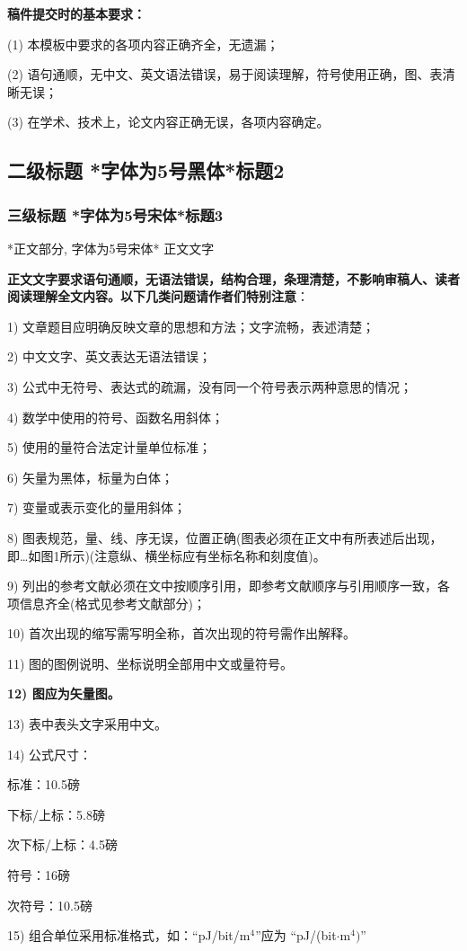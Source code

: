 \documentclass[10.5pt,compsoc]{CjC}
\theoremstyle{mystyle}
\begin{document}
{\bf 稿件提交时的基本要求：}

(1) 本模板中要求的各项内容正确齐全，无遗漏；

(2) 语句通顺，无中文、英文语法错误，易于阅读理解，符号使用正确，图、表清晰无误；

(3) 在学术、技术上，论文内容正确无误，各项内容确定。

{\heiti \subsection{二级标题 *字体为5号黑体*标题2} }
\subsubsection{三级标题 *字体为5号宋体*标题3}
*正文部分, 字体为5号宋体* 正文文字

\textbf{正文文字要求语句通顺，无语法错误，结构合理，条理清楚，不影响审稿人、读者阅读理解全文内容。以下几类问题请作者们特别注意}：

1) 文章题目应明确反映文章的思想和方法；文字流畅，表述清楚；

2) 中文文字、英文表达无语法错误；

3) 公式中无符号、表达式的疏漏，没有同一个符号表示两种意思的情况；

4) 数学中使用的符号、函数名用斜体；

5) 使用的量符合法定计量单位标准；

6) 矢量为黑体，标量为白体；

7) 变量或表示变化的量用斜体；

8) 图表规范，量、线、序无误，位置正确(图表必须在正文中有所表述后出现，即{\ldots}如图1所示)(注意纵、横坐标应有坐标名称和刻度值)。

9) 列出的参考文献必须在文中按顺序引用，即参考文献顺序与引用顺序一致，各项信息齐全(格式见参考文献部分)；

10) 首次出现的缩写需写明全称，首次出现的符号需作出解释。

11) 图的图例说明、坐标说明全部用中文或量符号。

\textbf{12) 图应为矢量图。}

13) 表中表头文字采用中文。

14) 公式尺寸：

标准：10.5磅

下标/上标：5.8磅

次下标/上标：4.5磅

符号：16磅

次符号：10.5磅

15) 组合单位采用标准格式，如：``pJ/bit/m$^{4}$''应为 ``pJ/(bit$\cdot
$m$^{4})$''
\end{document}
